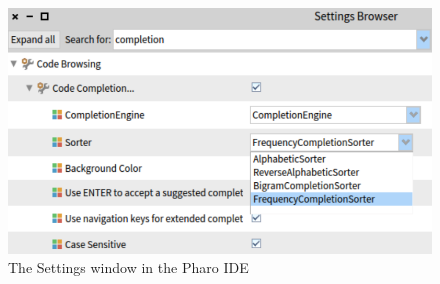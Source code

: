\begin{figure}[H]
    \centering
    \includegraphics[width=0.9\linewidth]{images/settings.png}
    \caption{The Settings window in the Pharo IDE}
    \label{fig:settings}
\end{figure}